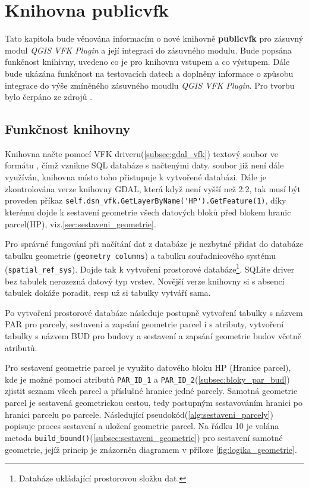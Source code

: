 \chapter{Knihovna publicvfk}
\label{4-plugin}
Tato kapitola bude věnována informacím o nové knihovně \textbf{publicvfk} pro zásuvný modul \textit{QGIS VFK Plugin} a její integraci do zásuvného modulu. Bude popsána funkčnost knihivny, uvedeno co je pro knihovnu vstupem a co výstupem. Dále bude ukázána funkčnost na testovacích datech a doplněny informace o způsobu integrace do výše zmíněného zásuvného moudlu \textit{QGIS VFK Plugin}. Pro tvorbu bylo čerpáno ze zdrojů \cite{cookbook, ucebnicepython}.

\section{Funkčnost knihovny}
\label{sec:funknost_knihovny}
Knihovna načte pomocí VFK driveru(\ref{subsec:gdal_vfk}) textový soubor ve formátu , čímž vznikne SQL databáze s načtenými daty.  soubor již není dále využíván, knihovna místo toho přistupuje k vytvořené databázi. Dále je zkontrolována verze knihovny GDAL, která když není vyšší než 2.2, tak musí být proveden příkaz \verb|self.dsn_vfk.GetLayerByName('HP').GetFeature(1)|, díky kterému dojde k sestavení geometrie všech datových bloků před blokem hranic parcel(HP), viz.\ref{sec:sestaveni_geometrie}.

Pro správné fungování při načítání dat z databáze je nezbytné přidat do databáze tabulku geometrie (\verb|geometry columns|) a tabulku souřadnicového systému (\verb|spatial_ref_sys|). Dojde tak k vytvoření prostorové databáze\footnote{Databáze ukládající prostorovou složku dat.}. SQLite driver bez tabulek nerozezná datový typ vrstev. Novější verze knihovny si s absencí tabulek dokáže poradit, resp už si tabulky vytváří sama.

Po vytvoření prostorové databáze následuje postupně vytvoření tabulky s názvem PAR pro parcely, sestavení a zapsání geometrie parcel i s atributy, vytvoření tabulky s názvem BUD pro budovy a sestavení a zapsání geometrie budov včetně atributů.

Pro sestavení geometrie parcel je využito datového bloku HP (Hranice parcel), kde je možné pomocí atributů \verb|PAR_ID_1| a \verb|PAR_ID_2|(\ref{subsec:bloky_par_bud}) zjistit seznam všech parcel a příslušné hranice jedné parcely. Samotná geometrie parcel je sestavená geometrickou cestou, tedy postupným sestavováním hranici po hranici parcelu po parcele. Následující pseudokód(\ref{alg:sestaveni_parcely}) popisuje proces sestavení a uložení geometrie parcel. Na řádku 10 je volána metoda \verb|build_bound()|(\ref{subsec:sestaveni_geometrie}) pro sestavení samotné geometrie, jejíž princip je znázorněn diagramem v příloze \ref{fig:logika_geometrie}.

